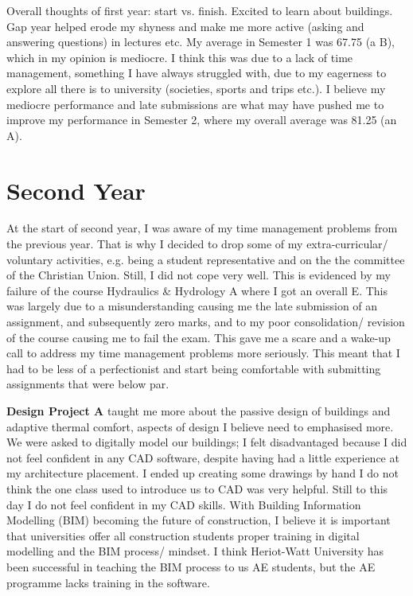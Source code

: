 Overall thoughts of first year: start vs. finish.
Excited to learn about buildings.
Gap year helped erode my shyness and make me more active (asking and answering questions) in lectures etc.
My average in Semester 1 was 67.75 (a B), which in my opinion is mediocre.
I think this was due to a lack of time management, something I have always struggled with, due to my eagerness to explore all there is to university (societies, sports and trips etc.).
I believe my mediocre performance and late submissions are what may have pushed me to improve my performance in Semester 2, where my overall average was 81.25 (an A).



\section{Second Year}


At the start of second year, I was aware of my time management problems from the previous year.
That is why I decided to drop some of my extra-curricular/ voluntary activities, e.g. being a student representative and on the the committee of the Christian Union.
Still, I did not cope very well.
This is evidenced by my failure of the course Hydraulics \& Hydrology A where I got an overall E.
This was largely due to a misunderstanding causing me the late submission of an assignment, and subsequently zero marks, and to my poor consolidation/ revision of the course causing me to fail the exam.
This gave me a scare and a wake-up call to address my time management problems more seriously.
This meant that I had to be less of a perfectionist and start being comfortable with submitting assignments that were below par.

\textbf{Design Project A} taught me more about the passive design of buildings and adaptive thermal comfort, aspects of design I believe need to emphasised more.
We were asked to digitally model our buildings; I felt disadvantaged because I did not feel confident in any CAD software, despite having had a little experience at my architecture placement.
I ended up creating some drawings by hand
I do not think the one class used to introduce us to CAD was very helpful.
Still to this day I do not feel confident in my CAD skills.
With Building Information Modelling (BIM) becoming the future of construction, I believe it is important that universities offer all construction students proper training in digital modelling and the BIM process/ mindset.
I think Heriot-Watt University has been successful in teaching the BIM process to us AE students, but the AE programme lacks training in the software.

